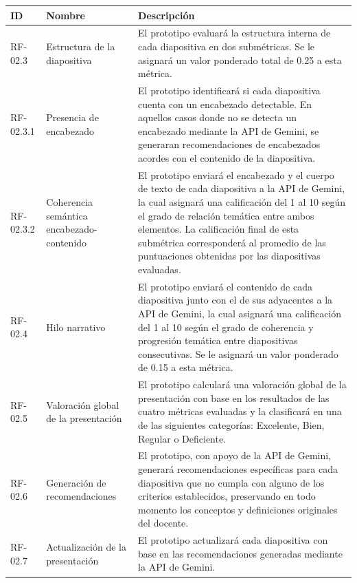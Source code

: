 \documentclass[11pt]{article}
\begin{document}
\begin{table}[H]
    \centering
    \begin{tabular}{|L{1.8cm}|L{4.2cm}|L{8.1cm}|}
        \hline
        \textbf{ID} & \textbf{Nombre} & \textbf{Descripción} \\
        \hline
        RF-02.3 & Estructura de la diapositiva & El prototipo evaluará la estructura interna de cada diapositiva en dos submétricas. Se le asignará un valor ponderado total de 0.25 a esta métrica. \\
        \hline
        RF-02.3.1 & Presencia de encabezado & El prototipo identificará si cada diapositiva cuenta con un encabezado detectable. En aquellos casos donde no se detecta un encabezado mediante la API de Gemini, se generaran recomendaciones de encabezados acordes con el contenido de la diapositiva. \\
        \hline
        RF-02.3.2 & Coherencia semántica encabezado-contenido & El prototipo enviará el encabezado y el cuerpo de texto de cada diapositiva a la API de Gemini, la cual asignará una calificación del 1 al 10 según el grado de relación temática entre ambos elementos. La calificación final de esta submétrica corresponderá al promedio de las puntuaciones obtenidas por las diapositivas evaluadas. \\
        \hline
        RF-02.4 & Hilo narrativo & El prototipo enviará el contenido de cada diapositiva junto con el de sus adyacentes a la API de Gemini, la cual asignará una calificación del 1 al 10 según el grado de coherencia y progresión temática entre diapositivas consecutivas. Se le asignará un valor ponderado de 0.15 a esta métrica. \\
        \hline
        RF-02.5 & Valoración global de la presentación & El prototipo calculará una valoración global de la presentación con base en los resultados de las cuatro métricas evaluadas y la clasificará en una de las siguientes categorías: Excelente, Bien, Regular o Deficiente. \\
        \hline
        RF-02.6 & Generación de recomendaciones & El prototipo, con apoyo de la API de Gemini, generará recomendaciones específicas para cada diapositiva que no cumpla con alguno de los criterios establecidos, preservando en todo momento los conceptos y definiciones originales del docente. \\
        \hline
        RF-02.7 & Actualización de la presentación & El prototipo actualizará cada diapositiva con base en las recomendaciones generadas mediante la API de Gemini. \\

\end{tabular}
\end{table}
\end{document}
